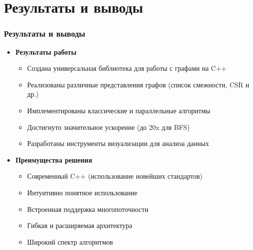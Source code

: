 \documentclass[aspectratio=169]{beamer}
\begin{document}

\section{Результаты и выводы}
\begin{frame}
  \frametitle{Результаты и выводы}
  \begin{itemize}
    \item \textbf{Результаты работы}
      \begin{itemize}
        \item Создана универсальная библиотека для работы с графами на C++
        \item Реализованы различные представления графов (список смежности, CSR и др.)
        \item Имплементированы классические и параллельные алгоритмы
        \item Достигнуто значительное ускорение (до 20x для BFS)
        \item Разработаны инструменты визуализации для анализа данных
      \end{itemize}
    \item \textbf{Преимущества решения}
      \begin{itemize}
        \item Современный C++ (использование новейших стандартов)
        \item Интуитивно понятное использование
        \item Встроенная поддержка многопоточности
        \item Гибкая и расширяемая архитектура
        \item Широкий спектр алгоритмов
      \end{itemize}
  \end{itemize}
\end{frame}
\end{document}

